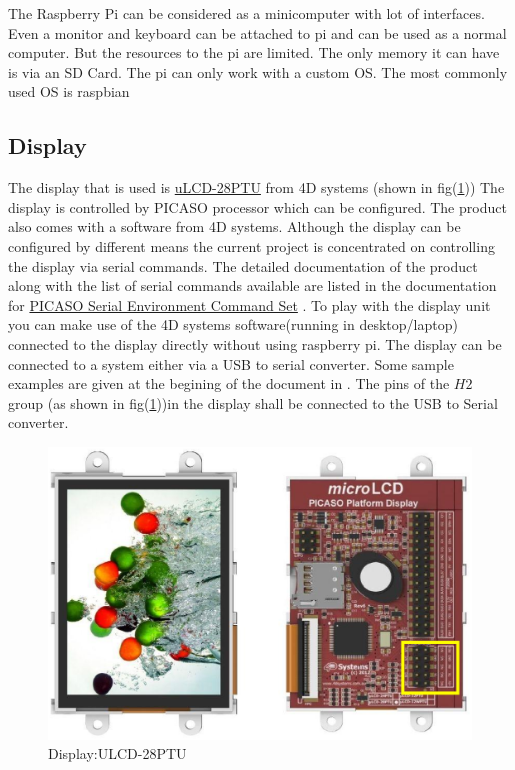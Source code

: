 \documentclass[12pt, a4paper, twoside]{article}
\begin{document}
The Raspberry Pi can be considered as a minicomputer with lot of interfaces. Even a monitor and keyboard can be attached to pi and can be used as a normal computer. But the resources to the pi are limited. The only memory it can have is via an SD Card. The pi can only work with a custom OS. The most commonly used OS is raspbian \cite{bib_raspbian}

\subsection{Display}

The display that is used is \href{http://www.4dsystems.com.au/product/uLCD_28PTU/}{uLCD-28PTU} from 4D systems \cite{bib_ulcd} (shown in fig(\ref{fig_ulcd}))  The display is controlled by PICASO processor which can be configured. The product also comes with a software from 4D systems. Although the display can be configured by different means the current project is concentrated on controlling the display via serial commands. The detailed documentation of the product along with the list of serial commands available are listed in the documentation for \href{http://www.4dsystems.com.au/productpages/PICASO/downloads/PICASO_serialcmdmanual_R_2_0.pdf}{PICASO Serial Environment Command Set} \cite{bib_serulcd}. To play with the display unit you can make use of the 4D systems software(running in desktop/laptop) connected to the display directly without using raspberry pi. The display can be connected to a system either via a USB to serial converter. Some sample examples are given at the begining of the document in \cite{bib_serulcd}. The pins of the $H2$ group (as shown in fig(\ref{fig_ulcd}))in the display shall be connected to the USB to Serial converter.

\begin{figure}[ht]
    \centering
    \includegraphics[scale=0.7]{ulcd-28ptu.eps}
    \caption{Display:ULCD-28PTU}
    \label{fig_ulcd}
\end{figure}
\end{document}
